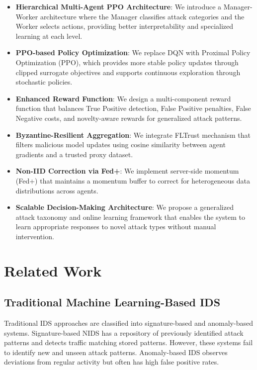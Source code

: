\documentclass[conference]{IEEEtran}
\begin{document}
\begin{itemize}
    \item \textbf{Hierarchical Multi-Agent PPO Architecture}: We introduce a Manager-Worker architecture where the Manager classifies attack categories and the Worker selects actions, providing better interpretability and specialized learning at each level.

    \item \textbf{PPO-based Policy Optimization}: We replace DQN with Proximal Policy Optimization (PPO), which provides more stable policy updates through clipped surrogate objectives and supports continuous exploration through stochastic policies.

    \item \textbf{Enhanced Reward Function}: We design a multi-component reward function that balances True Positive detection, False Positive penalties, False Negative costs, and novelty-aware rewards for generalized attack patterns.

    \item \textbf{Byzantine-Resilient Aggregation}: We integrate FLTrust mechanism that filters malicious model updates using cosine similarity between agent gradients and a trusted proxy dataset.

    \item \textbf{Non-IID Correction via Fed+}: We implement server-side momentum (Fed+) that maintains a momentum buffer to correct for heterogeneous data distributions across agents.

    \item \textbf{Scalable Decision-Making Architecture}: We propose a generalized attack taxonomy and online learning framework that enables the system to learn appropriate responses to novel attack types without manual intervention.
\end{itemize}

\section{Related Work}

\subsection{Traditional Machine Learning-Based IDS}

Traditional IDS approaches are classified into signature-based and anomaly-based systems. Signature-based NIDS has a repository of previously identified attack patterns and detects traffic matching stored patterns. However, these systems fail to identify new and unseen attack patterns. Anomaly-based IDS observes deviations from regular activity but often has high false positive rates.
\end{document}
